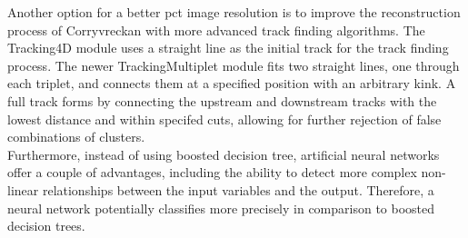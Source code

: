 Another option for a better pct image resolution is to improve the reconstruction process of Corryvreckan with more advanced track finding algorithms.
The Tracking4D module uses a straight line as the initial track for
the track finding process. The newer TrackingMultiplet module fits two straight lines, one through each triplet, and connects them at a specified position with an arbitrary kink.
A full track forms by connecting the upstream and downstream tracks with the lowest distance and within specifed cuts, allowing for further rejection of false combinations
of clusters. \\
Furthermore, instead of using boosted decision tree, artificial neural networks \cite{ann} offer a couple of advantages,
including the ability to detect more complex non-linear relationships between the input variables and the output. Therefore, a neural network potentially classifies
more precisely in comparison to boosted decision trees.
